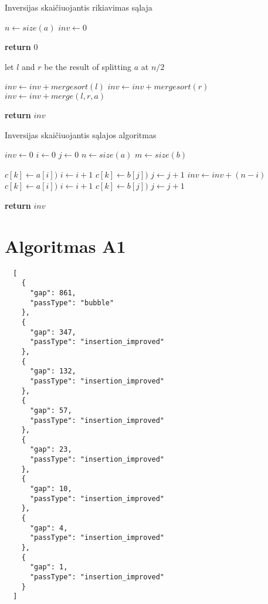 \documentclass{VUMIFInfKursinis}
\begin{document}
\begin{algorithm}[H]
  \caption{Inversijas skaičiuojantis rikiavimas sąlaja}\label{alg:merge_sort}
  \begin{algorithmic}[1]
      \State $n \gets size(a)$
      \State $inv \gets 0$
      
        \State \textbf{return} $0$ 
      \EndIf

      \State let $l$ and $r$ be the result of splitting $a$ at $n/2$

      \State $inv \gets inv + mergesort(l)$
      \State $inv \gets inv + mergesort(r)$
      \State $inv \gets inv + merge(l,r,a)$

      \State \textbf{return} $inv$ 

    \EndProcedure
  \end{algorithmic}
\end{algorithm}

\begin{algorithm}[H]
  \caption{Inversijas skaičiuojantis sąlajos algoritmas}\label{alg:merge}
  \begin{algorithmic}[1]
      \State $inv \gets 0$
      \State $i \gets 0$
      \State $j \gets 0$
      \State $n \gets size(a)$
      \State $m \gets size(b)$
      
              \State $c[k] \gets a[i])$
              \State $i \gets i+1$
            \Else
              \State $c[k] \gets b[j])$
              \State $j \gets j+1$
              \State $inv \gets inv + (n-i)$
            \EndIf
          \Else
            \State $c[k] \gets a[i])$
            \State $i \gets i+1$
          \EndIf
        \Else
          \State $c[k] \gets b[j])$
          \State $j \gets j+1$
        \EndIf
      \EndFor

      \State \textbf{return} $inv$
      
    \EndProcedure
  \end{algorithmic}
\end{algorithm}

\section{Algoritmas A1}

\lstset{language=json}
\begin{lstlisting}
  [
    {
      "gap": 861,
      "passType": "bubble"
    },
    {
      "gap": 347,
      "passType": "insertion_improved"
    },
    {
      "gap": 132,
      "passType": "insertion_improved"
    },
    {
      "gap": 57,
      "passType": "insertion_improved"
    },
    {
      "gap": 23,
      "passType": "insertion_improved"
    },
    {
      "gap": 10,
      "passType": "insertion_improved"
    },
    {
      "gap": 4,
      "passType": "insertion_improved"
    },
    {
      "gap": 1,
      "passType": "insertion_improved"
    }
  ]
\end{lstlisting}
\end{document}
